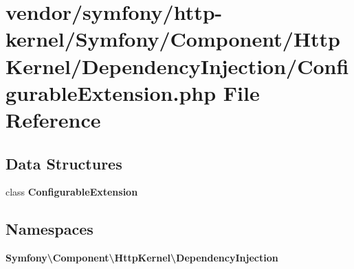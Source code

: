 \section{vendor/symfony/http-\/kernel/\+Symfony/\+Component/\+Http\+Kernel/\+Dependency\+Injection/\+Configurable\+Extension.php File Reference}
\label{_configurable_extension_8php}
\subsection*{Data Structures}
\begin{DoxyCompactItemize}
\item 
class {\bf Configurable\+Extension}
\end{DoxyCompactItemize}
\subsection*{Namespaces}
\begin{DoxyCompactItemize}
\item 
 {\bf Symfony\textbackslash{}\+Component\textbackslash{}\+Http\+Kernel\textbackslash{}\+Dependency\+Injection}
\end{DoxyCompactItemize}
